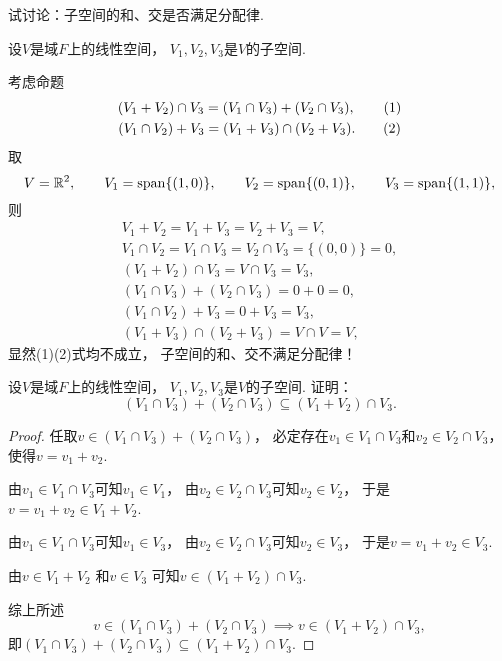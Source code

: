 \begin{example}
试讨论：子空间的和、交是否满足分配律.
\begin{solution}
设\(V\)是域\(F\)上的线性空间，
\(V_1,V_2,V_3\)是\(V\)的子空间.

考虑命题\begin{gather*}
	(V_1 + V_2) \cap V_3
	= (V_1 \cap V_3) + (V_2 \cap V_3),
	\tag1 \\
	(V_1 \cap V_2) + V_3
	= (V_1 + V_3) \cap (V_2 + V_3).
	\tag2
\end{gather*}
取\[
	V = \mathbb{R}^2,
	\qquad
	V_1 = \Span\{(1,0)\},  %
	\qquad
	V_2 = \Span\{(0,1)\},  %
	\qquad
	V_3 = \Span\{(1,1)\},  %
\]
则\begin{gather*}
	V_1 + V_2
	= V_1 + V_3
	= V_2 + V_3
	= V, \\
	V_1 \cap V_2
	= V_1 \cap V_3
	= V_2 \cap V_3
	= \{ (0,0) \}
	= 0, \\
	(V_1 + V_2) \cap V_3
	= V \cap V_3
	= V_3, \\
	(V_1 \cap V_3) + (V_2 \cap V_3)
	= 0 + 0
	= 0, \\
	(V_1 \cap V_2) + V_3
	= 0 + V_3
	= V_3, \\
	(V_1 + V_3) \cap (V_2 + V_3)
	= V \cap V
	= V,
\end{gather*}
显然(1)(2)式均不成立，
子空间的和、交不满足分配律！
\end{solution}
\end{example}
\begin{example}
设\(V\)是域\(F\)上的线性空间，
\(V_1,V_2,V_3\)是\(V\)的子空间.
证明：\begin{equation}
	(V_1 \cap V_3) + (V_2 \cap V_3) \subseteq (V_1 + V_2) \cap V_3.
\end{equation}
\begin{proof}
任取\(v \in (V_1 \cap V_3) + (V_2 \cap V_3)\)，
必定存在\(v_1 \in V_1 \cap V_3\)和\(v_2 \in V_2 \cap V_3\)，
使得\(v = v_1 + v_2\).

由\(v_1 \in V_1 \cap V_3\)可知\(v_1 \in V_1\)，
由\(v_2 \in V_2 \cap V_3\)可知\(v_2 \in V_2\)，
于是\(v = v_1 + v_2 \in V_1 + V_2\).

由\(v_1 \in V_1 \cap V_3\)可知\(v_1 \in V_3\)，
由\(v_2 \in V_2 \cap V_3\)可知\(v_2 \in V_3\)，
于是\(v = v_1 + v_2 \in V_3\).

由\(v \in V_1 + V_2\)
和\(v \in V_3\)
可知\(v \in (V_1 + V_2) \cap V_3\).

综上所述\[
	v \in (V_1 \cap V_3) + (V_2 \cap V_3)
	\implies
	v \in (V_1 + V_2) \cap V_3,
\]
即\((V_1 \cap V_3) + (V_2 \cap V_3) \subseteq (V_1 + V_2) \cap V_3\).
\end{proof}
\end{example}
